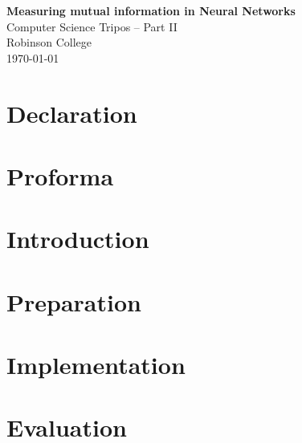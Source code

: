 \documentclass[12pt,a4paper,twoside,openright]{report}
\begin{document}





\pagestyle{empty}


\vspace*{60mm}
\begin{center}
\Huge
\textbf{Measuring mutual information in Neural Networks} \\[5mm]
Computer Science Tripos -- Part II \\[5mm]
Robinson College \\[5mm]
\today  %
\end{center}


\pagestyle{plain}

\chapter*{Declaration}


\chapter*{Proforma}


\tableofcontents
\listoffigures


\pagestyle{headings}

\chapter{Introduction}


\chapter{Preparation}


\chapter{Implementation}



\chapter{Evaluation}

\end{document}
